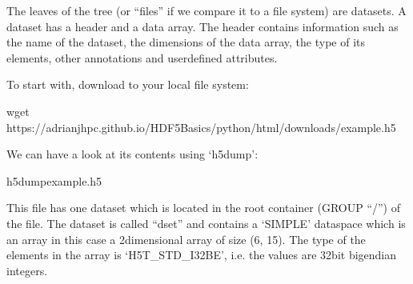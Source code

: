 \documentclass[letterpaper,10pt,english]{sphinxmanual}
\begin{document}
\sphinxAtStartPar
The leaves of the tree (or “files” if we compare it to a file system) are datasets. A dataset has a header and a data array. The header contains information such as the name of the dataset, the dimensions of the data array, the type of its elements, other annotations and user\sphinxhyphen{}defined attributes.

\sphinxAtStartPar
To start with, download  to your local file system:

\begin{sphinxVerbatim}[commandchars=\\\{\}]
\PYGZdl{} wget https://adrianjhpc.github.io/HDF5\PYGZhy{}Basics/python/html/\PYGZus{}downloads/example.h5
\end{sphinxVerbatim}

\sphinxAtStartPar
We can have a look at its contents using ‘h5dump’:

\begin{sphinxVerbatim}[commandchars=\\\{\}]
h5dumpexample.h5
\end{sphinxVerbatim}

\sphinxAtStartPar
This file has one dataset which is located in the root container (GROUP “/”) of the file.
The dataset is called “dset” and contains a ‘SIMPLE’ dataspace which is an array \sphinxhyphen{} in this case a 2\sphinxhyphen{}dimensional array of size (6, 15).
The type of the elements in the array is ‘H5T\_STD\_I32BE’, i.e. the values are 32\sphinxhyphen{}bit big\sphinxhyphen{}endian integers.
\end{document}
